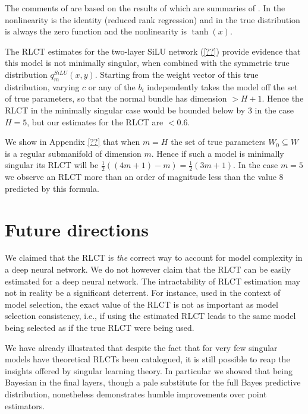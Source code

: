 \documentclass{article} %
\begin{document}
The comments of \citep[\S 7.6]{watanabe_algebraic_2009} are based on the results of \citep[\S 7.2]{watanabe_algebraic_2009} which are summaries of \cite{??,??}. In \cite{??} the nonlinearity is the identity (reduced rank regression) and in \cite{??} the true distribution is always the zero function and the nonlinearity is $\operatorname{tanh}(x)$.

The RLCT estimates for the two-layer SiLU network (\ref{??}) provide evidence that this model is not minimally singular, when combined with the symmetric true distribution $q^{SiLU}_m(x,y)$. Starting from the weight vector of this true distribution, varying $c$ or any of the $b_i$ independently takes the model off the set of true parameters, so that the normal bundle has dimension $> H + 1$. Hence the RLCT in the minimally singular case would be bounded below by $3$ in the case $H = 5$, but our estimates for the RLCT are $< 0.6$.

We show in Appendix \ref{??} that when $m = H$ the set of true parameters $W_0 \subseteq W$ is a regular submanifold of dimension $m$. Hence if such a model is minimally singular its RLCT will be $\tfrac{1}{2}( (4m + 1) - m ) = \tfrac{1}{2}( 3m + 1 )$. In the case $m = 5$ we observe an RLCT more than an order of magnitude less than the value $8$ predicted by this formula.

\section{Future directions}
We claimed that the RLCT is \textit{the} correct way to account for model complexity in a deep neural network. We do not however claim that the RLCT can be easily estimated for a deep neural network. The intractability of RLCT estimation may not in reality be a significant deterrent. For instance, used in the context of model selection, the exact value of the RLCT is not as important as model selection consistency, i.e., if using the estimated RLCT leads to the same model being selected as if the true RLCT were being used. 

We have already illustrated that despite the fact that for very few singular models have theoretical RLCTs been catalogued, it is still possible to reap the insights offered by singular learning theory. In particular we showed that being Bayesian in the final layers, though a pale substitute for the full Bayes predictive distribution, nonetheless demonstrates humble improvements over point estimators. 
%
\end{document}
